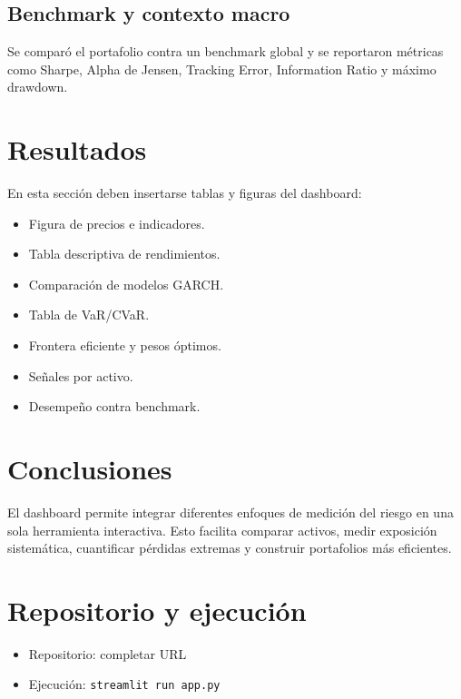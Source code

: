 \documentclass[11pt]{article}
\begin{document}
\subsection{Benchmark y contexto macro}
Se comparó el portafolio contra un benchmark global y se reportaron métricas como Sharpe, Alpha de Jensen, Tracking Error, Information Ratio y máximo drawdown.

\section{Resultados}
En esta sección deben insertarse tablas y figuras del dashboard:
\begin{itemize}
    \item Figura de precios e indicadores.
    \item Tabla descriptiva de rendimientos.
    \item Comparación de modelos GARCH.
    \item Tabla de VaR/CVaR.
    \item Frontera eficiente y pesos óptimos.
    \item Señales por activo.
    \item Desempeño contra benchmark.
\end{itemize}

\section{Conclusiones}
El dashboard permite integrar diferentes enfoques de medición del riesgo en una sola herramienta interactiva. Esto facilita comparar activos, medir exposición sistemática, cuantificar pérdidas extremas y construir portafolios más eficientes.

\section*{Repositorio y ejecución}
\begin{itemize}
    \item Repositorio: completar URL
    \item Ejecución: \texttt{streamlit run app.py}
\end{itemize}
\end{document}
